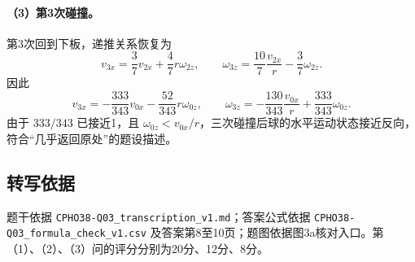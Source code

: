 \paragraph{（3）第3次碰撞。}
第3次回到下板，递推关系恢复为
\[
v_{3x}=\frac37v_{2x}+\frac47r\omega_{2z},\qquad
\omega_{3z}=\frac{10}{7}\frac{v_{2x}}r-\frac37\omega_{2z}.
\]
因此
\[
\boxed{v_{3x}=-\frac{333}{343}v_{0x}-\frac{52}{343}r\omega_{0z},\qquad
\omega_{3z}=-\frac{130}{343}\frac{v_{0x}}r+\frac{333}{343}\omega_{0z}.}
\]
由于 $333/343$ 已接近1，且 $\omega_{0z}<v_{0x}/r$，三次碰撞后球的水平运动状态接近反向，符合“几乎返回原处”的题设描述。

\subsection{转写依据}
题干依据 \texttt{CPHO38-Q03\_transcription\_v1.md}；答案公式依据 \texttt{CPHO38-Q03\_formula\_check\_v1.csv} 及答案第8至10页；题图依据图3a核对入口。第（1）、（2）、（3）问的评分分别为20分、12分、8分。
